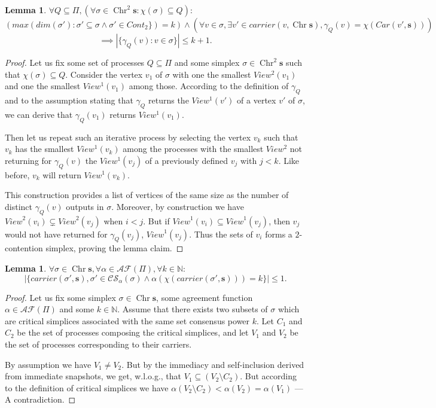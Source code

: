 \documentclass[a4paper]{article}
\newtheorem{lemma}[theorem]{Lemma}
\def\s {\mathbf{s}}
\def\Chr{\operatorname{Chr}}
\def\Car{\mathit{carrier}}
\begin{document}
\begin{lemma}{\label{ContAgreement}}
$\forall Q\subseteq \Pi, (\forall \sigma \in \Chr^2\s: \chi(\sigma)\subseteq Q):$
\[(max(\mathit{dim}(\sigma'): \sigma' \subseteq \sigma \wedge \sigma'\in \mathit{Cont}_2\})=k)
\wedge (\forall v\in\sigma,\exists v'\in\Car(v,\Chr\s),\gamma_Q(v)=\chi(Car(v',\s)))\]
\[ \implies
|\{\gamma_Q(v):v\in\sigma\}|\leq k+1{}.\]
\end{lemma}

\begin{proof}Let us fix some set of processes $Q\subseteq \Pi$ and some simplex $\sigma \in \Chr^2\s$ such that $\chi(\sigma)\subseteq Q$. Consider the vertex $v_1$ of $\sigma$ with one the smallest $View^2(v_1)$ and one the smallest $View^1(v_1)$ among those. According to the definition of $\gamma_Q$ and to the assumption stating that $\gamma_Q$ returns the $View^1(v')$ of a vertex $v'$ of $\sigma$, we can derive that $\gamma_Q(v_1)$ returns $View^1(v_1)$. 

Then let us repeat such an iterative process by selecting the vertex $v_k$ such that $v_k$ has the smallest $View^1(v_k)$ among the processes with the smallest $View^2$ not returning for $\gamma_Q(v)$ the $View^1(v_j)$ of a previously defined $v_j$ with $j<k$. Like before, $v_k$ will return 
$View^1(v_k)$. 

This construction provides a list of vertices of the same size as the number of distinct $\gamma_Q(v)$ outputs in $\sigma$. Moreover, by construction we have $\mathit{View}^2(v_i)\subsetneq \mathit{View}^2(v_j)$ when $i<j$. But if $\mathit{View}^1(v_i)\subseteq\mathit{View}^1(v_j)$, then $v_j$ would not have returned for $\gamma_Q(v_j)$, $\mathit{View}^1(v_j)$. Thus the sets of $v_i$ forms a $2$-contention simplex, proving the lemma claim.
\end{proof}

\begin{lemma}{\label{CSdistribution}}
$\forall \sigma\in \Chr\s,\forall \alpha\in\mathcal{AF}(\Pi),\forall k\in\mathbb{N}:$
\[
|\{\Car(\sigma',\s), \sigma'\in\mathcal{CS}_\alpha(\sigma)\wedge \alpha(\chi(\Car(\sigma',\s)))=k\}|\leq 1{}.
\]
\end{lemma}

\begin{proof}
Let us fix some simplex $\sigma\in \Chr\s$, some agreement function $\alpha\in\mathcal{AF}(\Pi)$ and some $k\in\mathbb{N}$. Assume that there exists two subsets of $\sigma$ which are critical simplices associated with the same set consensus power $k$. Let $C_1$ and $C_2$ be the set of processes composing the critical simplices, and let $V_1$ and $V_2$ be the set of processes corresponding to their carriers.

By assumption we have $V_1\neq V_2$. But by the immediacy and self-inclusion derived from immediate snapshots, we get, w.l.o.g., that $V_1\subseteq (V_2\setminus C_2)$. But according to the definition of critical simplices we have $\alpha(V_2\setminus C_2)<\alpha(V_2)=\alpha(V_1)$ --- A contradiction.
\end{proof}
\end{document}
